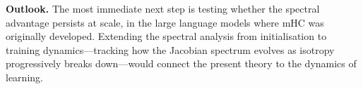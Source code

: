 \medskip
\noindent\textbf{Outlook.}
The most immediate next step is testing whether the spectral advantage persists at scale, in the large language models where mHC was originally developed. Extending the spectral analysis from initialisation to training dynamics---tracking how the Jacobian spectrum evolves as isotropy progressively breaks down---would connect the present theory to the dynamics of learning.
